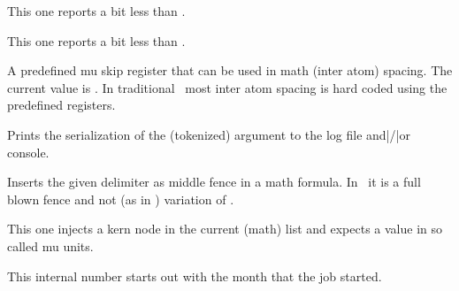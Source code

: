 \startbuffer
\tolerant\permanent\protected\gdef\foo[#1]#*[#2]{(#1)(#2)} \meaningfull\foo
\stopbuffer

\typebuffer \getbuffer \let\gfoo\relax

\stopnewprimitive

\startnewprimitive[title={\prm {meaningles}}]

This one reports a bit less than .

\startbuffer
\tolerant\permanent\protected\gdef\foo[#1]#*[#2]{(#1)(#2)} \meaningles\foo
\stopbuffer

\typebuffer \getbuffer \let\gfoo\relax

\stopnewprimitive

\startnewprimitive[title={\prm {meaningless}}]

This one reports a bit less than .

\startbuffer
\tolerant\permanent\protected\gdef\foo[#1]#*[#2]{(#1)(#2)} \meaningless\foo
\stopbuffer

\typebuffer \getbuffer \let\gfoo\relax

\stopnewprimitive

\startoldprimitive[title={\prm {medmuskip}}]

A predefined mu skip register that can be used in math (inter atom) spacing. The
current value is {\tt \the\medmuskip}. In traditional \TEX\ most inter atom
spacing is hard coded using the predefined registers.

\stopoldprimitive

\startoldprimitive[title={\prm {message}}]

Prints the serialization of the (tokenized) argument to the log file and|/|or
console.

\stopoldprimitive

\startoldprimitive[title={\prm {middle}}]

Inserts the given delimiter as middle fence in a math formula. In \LUAMETATEX\ it
is a full blown fence and not (as in \ETEX) variation of .

\stopoldprimitive

\startoldprimitive[title={\prm {mkern}}]

This one injects a kern node in the current (math) list and expects a value in so
called mu units.

\stopoldprimitive

\startoldprimitive[title={\prm {month}}]

This internal number starts out with the month that the job started.

